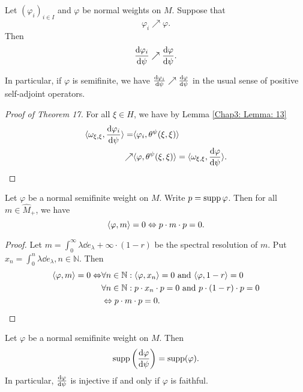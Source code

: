 \begin{theorem}
    Let $(\varphi_i)_{i\in I}$ and $\varphi$ be normal weights on $M$. Suppose that
    \[
        \varphi_i\nearrow \varphi.
    \]
    Then
    \[
        \dv{\varphi_i}{\psi}\nearrow\dv{\varphi}{\psi}.
    \]
\end{theorem}
\begin{remark}
    In particular, if $\varphi$ is semifinite, we have $\dv{\varphi_i}{\psi}\nearrow\dv{\varphi}{\psi}$ in the usual sense of positive self-adjoint operators.
\end{remark}
\begin{proof}[Proof of Theorem 17]
    For all $\xi\in H$, we have by Lemma \ref{Chap3: Lemma: 13}
    \[
        \begin{split}
            \langle\omega_{\xi,\xi},\dv{\varphi_i}{\psi}\rangle=&\langle\varphi_i,\theta^\psi(\xi,\xi)\rangle\\
            \nearrow&\langle\varphi,\theta^\psi(\xi,\xi)\rangle=\langle\omega_{\xi,\xi},\dv{\varphi}{\psi}\rangle.
        \end{split}
    \]
\end{proof}
\begin{lemma}\label{Chap3: Lemma: 19}
    Let $\varphi$ be a normal semifinite weight on $M$. Write $p=\operatorname{supp}\varphi$. Then for all $m\in \widehat{M}_+$, we have
    \[
        \langle\varphi,m\rangle=0\Leftrightarrow p\cdot m\cdot p=0.
    \]
\end{lemma}
\begin{proof}
    Let $m=\int_0^\infty \lambda\dd e_\lambda+\infty\cdot (1-r)$ be the spectral resolution of $m$. Put $x_n=\int_0^n \lambda\dd e_\lambda,n\in \mathbb{N}$. Then
    \[
        \begin{split}
            \langle\varphi,m\rangle=0\Leftrightarrow&\forall n\in \mathbb{N}:\langle\varphi,x_n\rangle=0\text{ and }\langle\varphi,1-r\rangle=0\\
            &\forall n\in \mathbb{N}:p\cdot x_n\cdot p=0\text{ and }p\cdot(1-r)\cdot p=0\\
            &\Leftrightarrow p\cdot m\cdot p=0.
        \end{split}
    \]
\end{proof}
\begin{theorem}
    Let $\varphi$ be a normal semifinite weight on $M$. Then
    \begin{equation}
        \operatorname{supp}\left( \dv{\varphi}{\psi} \right)=\operatorname{supp}(\varphi).
    \end{equation}
    In particular, $\dv{\varphi}{\psi}$ is injective if and only if $\varphi$ is faithful.
\end{theorem}
